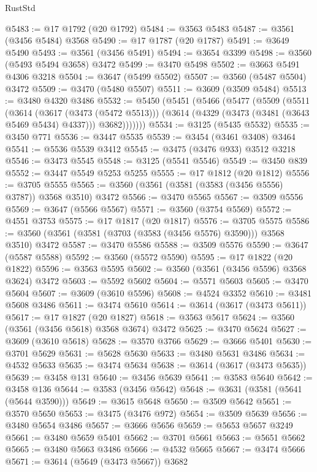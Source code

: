 \begin{lexlean}{RustStd}
\begin{coremodule}
@5483 := @17 @1792 (@20 @1792)
@5484 := @3563 @5483
@5487 := @3561 (@3456 @5484) @3568
@5490 := @17 @1787 (@20 @1787)
@5491 := @3649 @5490
@5493 := @3561 (@3456 @5491)
@5494 := @3654 @3399
@5498 := @3560 (@5493 @5494 @3658) @3472
@5499 := @3470 @5498
@5502 := @3663 @5491 @4306 @3218
@5504 := @3647 (@5499 @5502)
@5507 := @3560 (@5487 @5504) @3472
@5509 := @3470 (@5480 @5507)
@5511 := @3609 (@3509 @5484)
@5513 := @3480 @4320 @3486
@5532 := @5450
    (@5451
      (@5466
        (@5477
          (@5509
            (@5511
              (@3614
                (@3617 (@3473 (@5472 @5513)))
                (@3614 (@4329 (@3473 (@3481 (@3643 @5469 @5434) @4337))) @3682)))))))
@5534 := @3125 (@5435 @5532)
@5535 := @3450 @771
@5536 := @3447 @5535
@5539 := @3454 (@3461 @3408) @3464
@5541 := @5536 @5539 @3412
@5545 := @3475 (@3476 @933) @3512 @3218
@5546 := @3473 @5545
@5548 := @3125 (@5541 @5546)
@5549 := @3450 @839
@5552 := @3447 @5549 @5253 @5255
@5555 := @17 @1812 (@20 @1812)
@5556 := @3705 @5555
@5565 := @3560 (@3561 (@3581 (@3583 (@3456 @5556) @3787)) @3568 @3510) @3472
@5566 := @3470 @5565
@5567 := @3509 @5556
@5569 := @3647 (@5566 @5567)
@5571 := @3560 (@3754 @5569)
@5572 := @4551 @3753
@5575 := @17 @1817 (@20 @1817)
@5576 := @3705 @5575
@5586 := @3560 (@3561 (@3581 (@3703 (@3583 (@3456 @5576) @3590))) @3568 @3510) @3472
@5587 := @3470 @5586
@5588 := @3509 @5576
@5590 := @3647 (@5587 @5588)
@5592 := @3560 (@5572 @5590)
@5595 := @17 @1822 (@20 @1822)
@5596 := @3563 @5595
@5602 := @3560 (@3561 (@3456 @5596) @3568 @3624) @3472
@5603 := @5592 @5602
@5604 := @5571 @5603
@5605 := @3470 @5604
@5607 := @3609 (@3610 @5596)
@5608 := @4524 @3352
@5610 := @3481 @5608 @3486
@5611 := @3474 @5610
@5614 := @3614 (@3617 (@3473 @5611))
@5617 := @17 @1827 (@20 @1827)
@5618 := @3563 @5617
@5624 := @3560 (@3561 (@3456 @5618) @3568 @3674) @3472
@5625 := @3470 @5624
@5627 := @3609 (@3610 @5618)
@5628 := @3570 @3766
@5629 := @3666 @5401
@5630 := @3701 @5629
@5631 := @5628 @5630
@5633 := @3480 @5631 @3486
@5634 := @4532 @5633
@5635 := @3474 @5634
@5638 := @3614 (@3617 (@3473 @5635))
@5639 := @3458 @131
@5640 := @3456 @5639
@5641 := @3583 @5640
@5642 := @3458 @136
@5644 := @3583 (@3456 @5642)
@5648 := @3631 (@3581 (@5641 (@5644 @3590)))
@5649 := @3615 @5648
@5650 := @3509 @5642
@5651 := @3570 @5650
@5653 := @3475 (@3476 @972)
@5654 := @3509 @5639
@5656 := @3480 @5654 @3486
@5657 := @3666 @5656
@5659 := @5653 @5657 @3249
@5661 := @3480 @5659 @5401
@5662 := @3701 @5661
@5663 := @5651 @5662
@5665 := @3480 @5663 @3486
@5666 := @4532 @5665
@5667 := @3474 @5666
@5671 := @3614 (@5649 (@3473 @5667)) @3682

\end{coremodule}
\end{lexlean}
